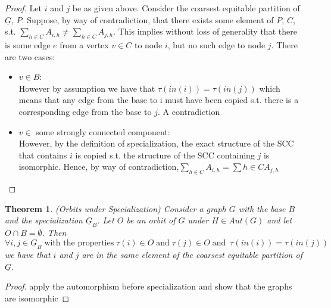 \documentclass[10pt]{elsarticle}
\newtheorem{theorem}{Theorem}
\theoremstyle{remark}
\begin{document}
\begin{proof}

Let $i$ and $j$ be as given above.
Consider the coarsest equitable partition of $\underline{G}$, $P$. Suppose, by way of contradiction, that there exists some element of $P$, $C$, s.t.
$\sum_{h \in C} A_{i,h} \neq \sum_{h \in C} A_{j,h}$.
This implies without loss of generality that there is some edge $e$ from a vertex $v \in C$ to node $i$, but no such edge to node $j$.
There are two cases:
\begin{itemize}
\item[Case 1] $v \in B$: \\
However by assumption we have that $\tau(in(i)) = \tau(in(j))$ which means that any edge from the base to i must have been copied s.t. there is a corresponding edge from the base to $j$. A contradiction

\item[Case 2] $v \in$ some strongly connected component: \\
However, by the definition of specialization, the exact structure of the SCC that contains $i$ is copied s.t. the structure of the SCC containing $j$ is isomorphic.
Hence, by way of contradiction,$\sum_{h \in C} A_{i,h} = \sum{h \in C} A_{j,h}$
\end{itemize}
\end{proof}

\begin{theorem}(Orbits under Specialization)
Consider a graph $G$ with the base $B$ and the specialization $\underline{G}_B$. Let $O$ be an orbit of $G$ under $H \in Aut(G)$ and let $O \cap B = \emptyset$. Then
\[
\forall i,j \in \underline{G}_B \;\text{with the properties}\; \tau(i) \in O \;\text{and}\; \tau(j) \in O \;\text{and}\;\: \tau(in(i)) = \tau(in(j))
\]
we have that $i$ and $j$ are in the same element of the coarsest equitable partition of $\underline{G}$.
\end{theorem}

\begin{proof}
apply the automorphism before specialization and show that the graphs are isomorphic
\end{proof}
\end{document}
